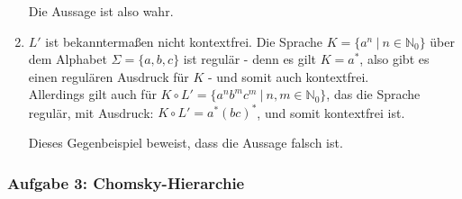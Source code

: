 \begin{teile}
\begin{enumerate}[label=\roman*.]
		Die Aussage ist also wahr.
				
		\item
		$L'$ ist bekanntermaßen nicht kontextfrei. Die Sprache $K = \{a^n\ |\ n \in \mathbb{N}_0\}$ über dem Alphabet $\Sigma = \{a,b,c\}$ ist regulär - denn es gilt $K = a^*$, also gibt es einen regulären Ausdruck für $K$ - und somit auch kontextfrei.\\
		Allerdings gilt auch für $K \circ L' = \{a^nb^mc^m\ |\ n,m \in \mathbb{N}_0\}$, das die Sprache regulär, mit Ausdruck: $K \circ L'= a^*(bc)^*$, und somit kontextfrei ist.
		
		Dieses Gegenbeispiel beweist, dass die Aussage falsch ist.
		
	\end{enumerate}
	
	
\end{teile}

\newpage
\subsubsection{Aufgabe 3: Chomsky-Hierarchie}


